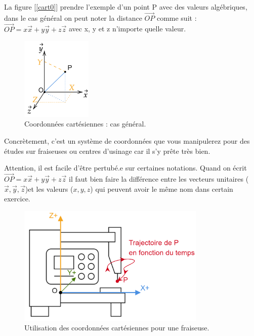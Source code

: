 \documentclass[
	11pt, %
	fleqn, %
	a4paper, %
]{LegrandOrangeBook}
\begin{document}
La figure [\ref{cart0}] prendre l'exemple d'un point P avec des valeurs algébriques, dans le cas général on peut noter la distance $\Vec{OP}$ comme suit : $\Vec{OP}=x\Vec{x}+y\Vec{y}+z\Vec{z}$ avec x, y et z n'importe quelle valeur.

\begin{figure}[H] %
	\centering %
	\includegraphics[width=0.3\textwidth]{Images/cart1.png} %
	\caption{Coordonnées cartésiennes : cas général.}
	\label{cart1} %
\end{figure}

Concrètement, c'est un système de coordonnées que vous manipulerez pour des études sur fraiseuses ou centres d'usinage car il s'y prête très bien.

\begin{remark}
    Attention, il est facile d'être pertubé.e sur certaines notations. Quand on écrit $\Vec{OP}=x\Vec{x}+y\Vec{y}+z\Vec{z}$ il faut bien faire la différence entre les vecteurs unitaires ($\Vec{x}, \Vec{y}, \Vec{z}$)et les valeurs ($x, y, z$) qui peuvent avoir le même nom dans certain exercice.
\end{remark}

\begin{figure}[H] %
	\centering %
	\includegraphics[width=0.8\textwidth]{Images/cart2.png} %
	\caption{Utilisation des coordonnées cartésiennes pour une fraiseuse.}
	\label{cart2} %
\end{figure}
\end{document}
